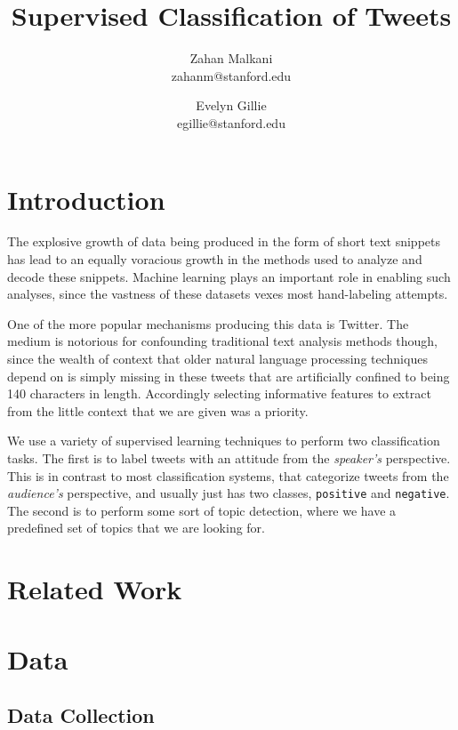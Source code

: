 \documentclass[fontsize=10pt,twocolumn,letterpaper,abstracton]{scrartcl}
\title{Supervised Classification of Tweets}
\author{Zahan Malkani\\zahanm@stanford.edu \and Evelyn Gillie
  \\ egillie@stanford.edu}
\date{}
\begin{document}
\maketitle

\begin{abstract}
  \textbf{}

  \textbf{}
\end{abstract}

\section{Introduction}

The explosive growth of data being produced in the form of short text snippets has lead to an equally voracious growth in the methods used to analyze and decode these snippets. Machine learning plays an important role in enabling such analyses, since the vastness of these datasets vexes most hand-labeling attempts.

One of the more popular mechanisms producing this data is Twitter. The medium is notorious for confounding traditional text analysis methods though, since the wealth of context that older natural language processing techniques depend on is simply missing in these tweets that are artificially confined to being 140 characters in length. Accordingly selecting informative features to extract from the little context that we are given was a priority.

We use a variety of supervised learning techniques to perform two classification tasks. The first is to label tweets with an attitude from the \emph{speaker's} perspective. This is in contrast to most classification systems, that categorize tweets from the \emph{audience's} perspective, and usually just has two classes, \verb|positive| and \verb|negative|. The second is to perform some sort of topic detection, where we have a predefined set of topics that we are looking for.

\section{Related Work}

\section{Data}
\subsection{Data Collection}
\end{document}
